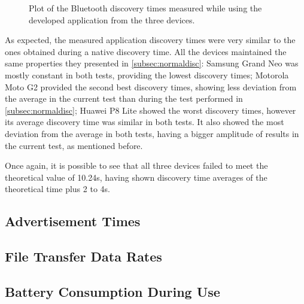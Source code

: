\begin{figure}[ht]
	\noindent{}
	\caption{\label{fig:appdisc} Plot of the Bluetooth discovery times measured while using the developed application from the three devices.}
\end{figure}

As expected, the measured application discovery times were very similar to the ones obtained during a native discovery time. All the devices maintained the same properties they presented in \ref{subsec:normaldisc}: Samsung Grand Neo was mostly constant in both tests, providing the lowest discovery times; Motorola Moto G2 provided the second best discovery times, showing less deviation from the average in the current test than during the test performed in \ref{subsec:normaldisc}; Huawei P8 Lite showed the worst discovery times, however its average discovery time was similar in both tests. It also showed the most deviation from the average in both tests, having a bigger amplitude of results in the current test, as mentioned before.

Once again, it is possible to see that all three devices failed to meet the theoretical value of 10.24s, having shown discovery time averages of the theoretical time plus 2 to 4s.

\subsection{Advertisement Times}

\subsection{File Transfer Data Rates}

\subsection{Battery Consumption During Use}





